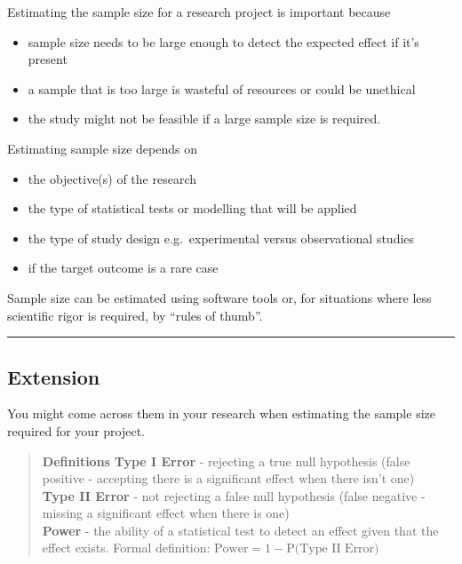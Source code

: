 \documentclass[
]{book}
\providecommand{\tightlist}{%
  \setlength{\itemsep}{0pt}\setlength{\parskip}{0pt}}
\begin{document}
Estimating the sample size for a research project is important because

\begin{itemize}
\tightlist
\item
  sample size needs to be large enough to detect the expected effect if it's present
\item
  a sample that is too large is wasteful of resources or could be unethical
\item
  the study might not be feasible if a large sample size is required.
\end{itemize}

Estimating sample size depends on

\begin{itemize}
\tightlist
\item
  the objective(s) of the research
\item
  the type of statistical tests or modelling that will be applied
\item
  the type of study design e.g.~experimental versus observational studies
\item
  if the target outcome is a rare case
\end{itemize}

Sample size can be estimated using software tools or, for situations where less scientific rigor is required, by ``rules of thumb''.

\begin{center}\rule{0.5\linewidth}{0.5pt}\end{center}

\subsection{Extension}\label{extension}

You might come across them in your research when estimating the sample size required for your project.

\begin{quote}
\textbf{Definitions}
\textbf{Type I Error} - rejecting a true null hypothesis (false positive - accepting there is a significant effect when there isn't one)\\
\textbf{Type II Error} - not rejecting a false null hypothesis (false negative - missing a significant effect when there is one)\\
\textbf{Power} - the ability of a statistical test to detect an effect given that the effect exists. Formal definition: \(\text{Power} = 1 - \text{P(Type II Error)}\)
\end{quote}
\end{document}
